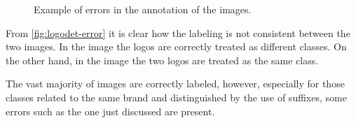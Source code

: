 \begin{figure}%
	\centering
	\hfill
	\caption{Example of errors in the annotation of the images.}
	\label{fig:logodet-error}%
\end{figure}

From \autoref{fig:logodet-error} it is clear how the labeling is not consistent between the two images. In the image  the logos are correctly treated as different classes. On the other hand, in the image  the two logos are treated as the same class.

The vast majority of images are correctly labeled, however, especially for those classes related to the same brand and distinguished by the use of suffixes, some errors such as the one just discussed are present.
